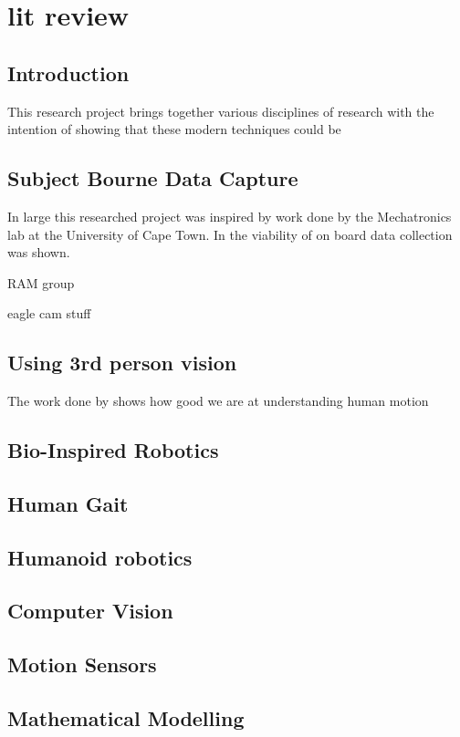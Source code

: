 \chapter{lit review}

\section{Introduction}
This research project brings together various disciplines of research with the intention of showing that these modern techniques could be

\section{Subject Bourne Data Capture}
In large this researched project was inspired by work done by the Mechatronics lab at the University of Cape Town. In \cite{patel2017trackingieee} the viability of on board data collection was shown.

RAM group

eagle cam stuff \cite{kane2014falcons}

\section{Using 3rd person vision}
The work done by \cite{chen2013survey} shows how good we are at understanding human motion 

\section{Bio-Inspired Robotics}

\section{Human Gait}

\section{Humanoid robotics}

\section{Computer Vision}

\section{Motion Sensors}

\section{Mathematical Modelling}

